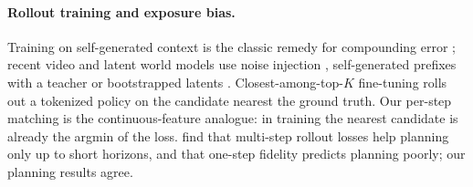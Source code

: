 \paragraph{Rollout training and exposure bias.}
Training on self-generated context is the classic remedy for compounding error \citep{ross2011dagger,venkatraman2015dad,bengio2015scheduled,lamb2016professor,hafner2019planet}; recent video and latent world models use noise injection \citep{chen2024diffusionforcing}, self-generated prefixes with a teacher \citep{huang2025selfforcing} or bootstrapped latents \citep{gao2026sword}. Closest-among-top-$K$ fine-tuning \citep{zhang2025catk} rolls out a tokenized policy on the candidate nearest the ground truth. Our per-step matching is the continuous-feature analogue: in \nom{} training the nearest candidate is already the argmin of the loss. \citet{terver2025drives} find that multi-step rollout losses help planning only up to short horizons, and \citet{cheung2026fidelity} that one-step fidelity predicts planning poorly; our planning results agree.
